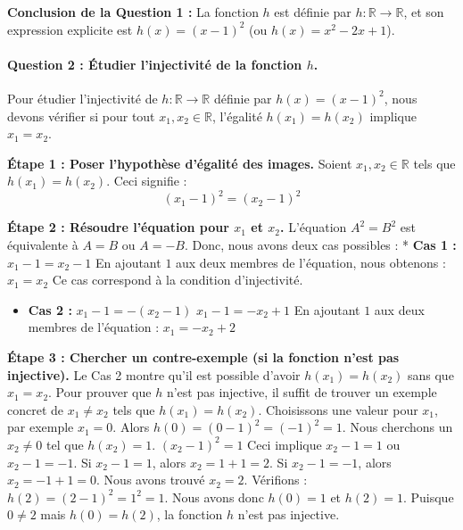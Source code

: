 \documentclass[12pt,a4paper]{report}
\providecommand{\tightlist}{%
  \setlength{\itemsep}{0pt}\setlength{\parskip}{0pt}}
\begin{document}
\textbf{Conclusion de la Question 1 :} La fonction \(h\) est définie par
\(h: \mathbb{R} \to \mathbb{R}\), et son expression explicite est
\(h(x) = (x-1)^2\) (ou \(h(x) = x^2 - 2x + 1\)).

\paragraph{\texorpdfstring{Question 2 : Étudier l'injectivité de la
fonction
\(h\).}{Question 2 : Étudier l'injectivité de la fonction h.}}\label{question-2-uxe9tudier-linjectivituxe9-de-la-fonction-h.}

Pour étudier l'injectivité de \(h: \mathbb{R} \to \mathbb{R}\) définie
par \(h(x) = (x-1)^2\), nous devons vérifier si pour tout
\(x_1, x_2 \in \mathbb{R}\), l'égalité \(h(x_1) = h(x_2)\) implique
\(x_1 = x_2\).

\textbf{Étape 1 : Poser l'hypothèse d'égalité des images.} Soient
\(x_1, x_2 \in \mathbb{R}\) tels que \(h(x_1) = h(x_2)\). Ceci signifie
: \[(x_1-1)^2 = (x_2-1)^2\]

\textbf{Étape 2 : Résoudre l'équation pour \(x_1\) et \(x_2\).}
L'équation \(A^2 = B^2\) est équivalente à \(A = B\) ou \(A = -B\).
Donc, nous avons deux cas possibles : * \textbf{Cas 1 :}
\(x_1-1 = x_2-1\) En ajoutant \(1\) aux deux membres de l'équation, nous
obtenons : \(x_1 = x_2\) Ce cas correspond à la condition d'injectivité.

\begin{itemize}
\tightlist
\item
  \textbf{Cas 2 :} \(x_1-1 = -(x_2-1)\) \(x_1-1 = -x_2+1\) En ajoutant
  \(1\) aux deux membres de l'équation : \(x_1 = -x_2+2\)
\end{itemize}

\textbf{Étape 3 : Chercher un contre-exemple (si la fonction n'est pas
injective).} Le Cas 2 montre qu'il est possible d'avoir
\(h(x_1) = h(x_2)\) sans que \(x_1 = x_2\). Pour prouver que \(h\) n'est
pas injective, il suffit de trouver un exemple concret de
\(x_1 \neq x_2\) tels que \(h(x_1) = h(x_2)\). Choisissons une valeur
pour \(x_1\), par exemple \(x_1 = 0\). Alors
\(h(0) = (0-1)^2 = (-1)^2 = 1\). Nous cherchons un \(x_2 \neq 0\) tel
que \(h(x_2) = 1\). \((x_2-1)^2 = 1\) Ceci implique \(x_2-1 = 1\) ou
\(x_2-1 = -1\). Si \(x_2-1 = 1\), alors \(x_2 = 1+1 = 2\). Si
\(x_2-1 = -1\), alors \(x_2 = -1+1 = 0\). Nous avons trouvé \(x_2 = 2\).
Vérifions : \(h(2) = (2-1)^2 = 1^2 = 1\). Nous avons donc \(h(0) = 1\)
et \(h(2) = 1\). Puisque \(0 \neq 2\) mais \(h(0) = h(2)\), la fonction
\(h\) n'est pas injective.
\end{document}
